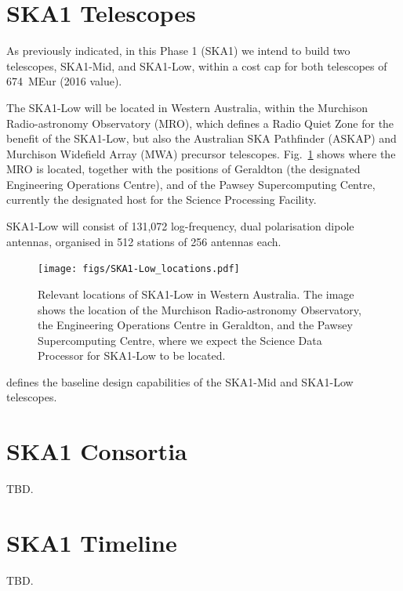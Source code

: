 \documentclass[a4paper,
               biblatex,       %
               keeplastbox,    %
               ]{jacow-2_1}    %
\begin{document}

\section{SKA1 Telescopes} %
\label{sec:ska1_telescopes}

As previously indicated, in this Phase 1 (SKA1) we intend to build two telescopes, SKA1-Mid, and SKA1-Low, within a cost cap for both telescopes of 674~MEur (2016 value).

The SKA1-Low will be located in Western Australia, within the Murchison Radio-astronomy Observatory (MRO), which defines a Radio Quiet Zone for the benefit of the SKA1-Low, but also the Australian SKA Pathfinder (ASKAP) and Murchison Widefield Array (MWA) precursor telescopes. Fig.~\ref{fig:figs_SKA1-Low_locations} shows where the MRO is located, together with the positions of Geraldton (the designated Engineering Operations Centre), and of the Pawsey Supercomputing Centre, currently the designated host for the Science Processing Facility.

SKA1-Low will consist of 131,072 log-frequency, dual polarisation dipole antennas, organised in 512 stations of 256 antennas each. 

\begin{figure}[!htb]
  \centering
    \texttt{[image: figs/SKA1-Low\_locations.pdf]}
  \caption{Relevant locations of SKA1-Low in Western Australia. The image shows the location of the Murchison Radio-astronomy Observatory,  the Engineering Operations Centre in Geraldton, and the Pawsey Supercomputing Centre, where we expect the Science Data Processor for SKA1-Low to be located.}
  \label{fig:figs_SKA1-Low_locations}
\end{figure}

\cite{SKA-TEL-SKO-0000002_v3} defines the baseline 
design capabilities of the SKA1-Mid and SKA1-Low telescopes.



\section{SKA1 Consortia} %
\label{sec:ska1_consortia}
TBD.


\section{SKA1 Timeline} %
\label{sec:ska1_timeline}
TBD.
 
\end{document}
